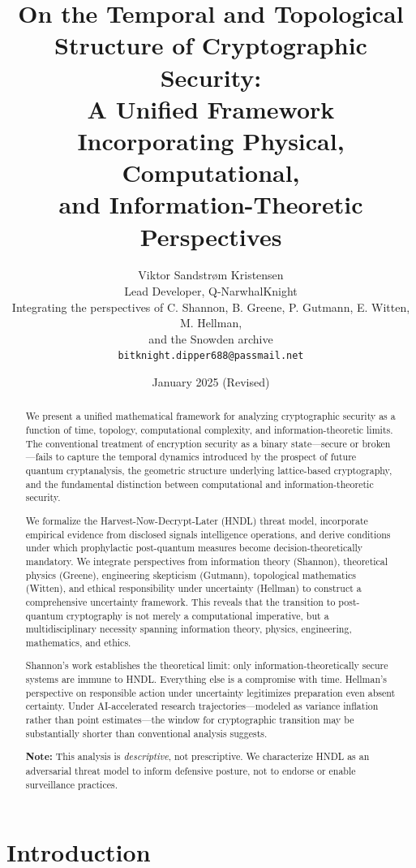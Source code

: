 \documentclass[11pt,a4paper]{article}
\title{\textbf{On the Temporal and Topological Structure of Cryptographic Security:\\[0.3em]
\large A Unified Framework Incorporating Physical, Computational,\\and Information-Theoretic Perspectives}}
\author{Viktor Sandstrøm Kristensen\\[0.3em]
\small Lead Developer, Q-NarwhalKnight\\[0.5em]
\small Integrating the perspectives of C. Shannon, B. Greene, P. Gutmann, E. Witten, M. Hellman,\\and the Snowden archive\\[0.3em]
\small \texttt{bitknight.dipper688@passmail.net}}
\date{January 2025 (Revised)}
\begin{document}
\maketitle

\begin{abstract}
We present a unified mathematical framework for analyzing cryptographic security as a function of time, topology, computational complexity, and information-theoretic limits. The conventional treatment of encryption security as a binary state---secure or broken---fails to capture the temporal dynamics introduced by the prospect of future quantum cryptanalysis, the geometric structure underlying lattice-based cryptography, and the fundamental distinction between computational and information-theoretic security.

We formalize the Harvest-Now-Decrypt-Later (HNDL) threat model, incorporate empirical evidence from disclosed signals intelligence operations, and derive conditions under which prophylactic post-quantum measures become decision-theoretically mandatory. We integrate perspectives from information theory (Shannon), theoretical physics (Greene), engineering skepticism (Gutmann), topological mathematics (Witten), and ethical responsibility under uncertainty (Hellman) to construct a comprehensive uncertainty framework. This reveals that the transition to post-quantum cryptography is not merely a computational imperative, but a multidisciplinary necessity spanning information theory, physics, engineering, mathematics, and ethics.

Shannon's work establishes the theoretical limit: only information-theoretically secure systems are immune to HNDL. Everything else is a compromise with time. Hellman's perspective on responsible action under uncertainty legitimizes preparation even absent certainty. Under AI-accelerated research trajectories---modeled as variance inflation rather than point estimates---the window for cryptographic transition may be substantially shorter than conventional analysis suggests.

\textbf{Note:} This analysis is \textit{descriptive}, not prescriptive. We characterize HNDL as an adversarial threat model to inform defensive posture, not to endorse or enable surveillance practices.
\end{abstract}

\section{Introduction}
\end{document}
